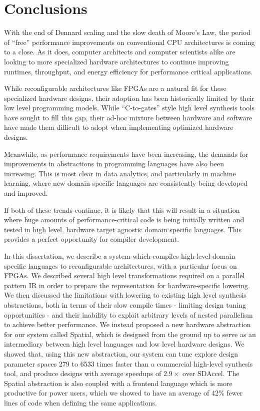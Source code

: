 \chapter{Conclusions}
\label{conclusion}
With the end of Dennard scaling and the slow death of Moore's Law, the period
of ``free'' performance improvements on conventional CPU architectures is coming
to a close. As it does, computer architects and computer scientists alike are
looking to more specialized hardware architectures to continue improving
runtimes, throughput, and energy efficiency for performance critical applications.

While reconfigurable architectures like FPGAs are a natural fit for these
specialized hardware designs, their adoption has been historically limited by
their low level programming models. While ``C-to-gates'' style
high level synthesis tools have sought to fill this gap,
their ad-hoc mixture between hardware and software have made them
difficult to adopt when implementing optimized hardware designs.

Meanwhile, as performance requirements have been increasing, the demands for
improvements in abstractions in programming languages have also been increasing.
This is most clear in data analytics, and particularly in machine learning, where
new domain-specific languages are consistently being developed and improved.

If both of these trends continue, it is likely that this will result in a situation
where huge amounts of performance-critical code is being initially written and
tested in high level, hardware target agnostic domain specific languages.
This provides a perfect opportunity for compiler development.

In this dissertation, we describe a system which compiles high level domain
specific languages to reconfigurable architectures, with a particular focus on FPGAs.
We described several high level transformations required on a parallel pattern IR
in order to prepare the representation for hardware-specific lowering.
We then discussed the limitations with lowering to existing high level synthesis abstractions,
both in terms of their slow compile times - limiting design tuning opportunities - and their
inability to exploit arbitrary levels of nested parallelism to achieve better performance.
We instead proposed a new hardware abstraction for our system called Spatial,
which is designed from the ground up to serve as an intermediary between
high level languages and low level hardware designs.
We showed that, using this new abstraction, our system can
tune explore design parameter spaces 279 to 6533 times
faster than a commercial high-level synthesis tool, and produce designs with average speedups
of $2.9\times$ over SDAccel.
The Spatial abstraction is also coupled with a frontend language which is more productive for power users,
which we showed to have an average of 42\% fewer lines of code when defining the same applications.

